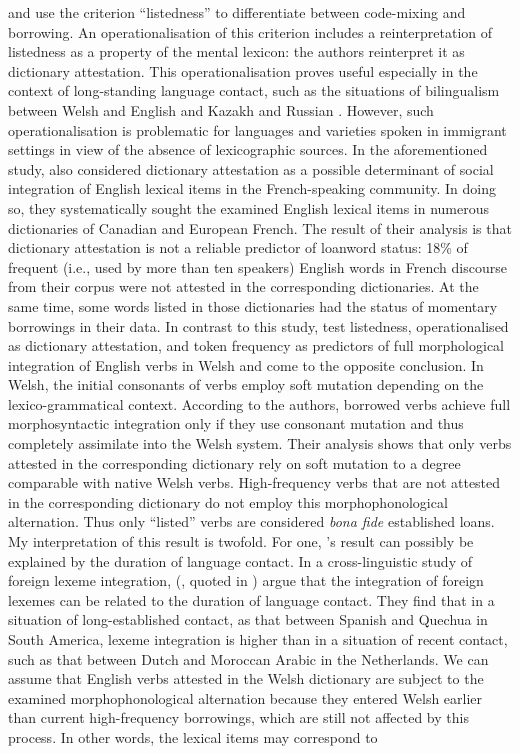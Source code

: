 \citet{muhamedowa-untersuchung-2006} and \citet{stammers-deuchar-2012} use the criterion ``listedness'' to differentiate between code-mixing and borrowing. An operationalisation of this criterion includes a reinterpretation of listedness as a property of the mental lexicon: the authors reinterpret it as dictionary attestation. This operationalisation proves useful especially in the context of long-standing language contact, such as the situations of bilingualism between Welsh and English \citep{stammers-deuchar-2012} and Kazakh and Russian \citep{muhamedowa-untersuchung-2006}. However, such operationalisation is problematic for languages and varieties spoken in immigrant settings in view of the absence of lexicographic sources. In the aforementioned study, \citet{poplack-etal-1988} also considered dictionary attestation as a possible determinant of social integration of English lexical items in the French-speaking community. In doing so, they systematically sought the examined English lexical items in numerous dictionaries of Canadian and European French. The result of their analysis \citep[58--59]{poplack-etal-1988} is that dictionary attestation is not a reliable predictor of loanword status: 18\% of frequent (i.e., used by more than ten speakers) English words in French discourse from their corpus were not attested in the corresponding dictionaries. At the same time, some words listed in those dictionaries had the status of momentary borrowings in their data. In contrast to this study, \citet{stammers-deuchar-2012} test listedness, operationalised as dictionary attestation, and token frequency as predictors of full morphological integration of English verbs in Welsh and come to the opposite conclusion. In Welsh, the initial consonants of verbs employ soft mutation depending on the lexico-grammatical context. According to the authors, borrowed verbs achieve full morphosyntactic integration only if they use consonant mutation and thus completely assimilate into the Welsh system. Their analysis shows that only verbs attested in the corresponding dictionary rely on soft mutation to a degree comparable with native Welsh verbs. High-frequency verbs that are not attested in the corresponding dictionary do not employ this morphophonological alternation. Thus only ``listed'' verbs are considered \textit{bona fide} established loans. My interpretation of this result is twofold. For one, \citeauthor{stammers-deuchar-2012}'s result can possibly be explained by the duration of language contact. In a cross-linguistic study of foreign lexeme integration, \citeauthor{nortier-schatz} (\citeyear{nortier-schatz}, quoted in \citealt[][53]{boumans-syntax-1998}) argue that the integration of foreign lexemes can be related to the duration of language contact. They find that in a situation of long-established contact, as that between Spanish and Quechua in South America, lexeme integration is higher than in a situation of recent contact, such as that between Dutch and Moroccan Arabic in the Netherlands. We can assume that English verbs attested in the Welsh dictionary are subject to the examined morphophonological alternation because they entered Welsh earlier than current high-frequency borrowings, which are still not affected by this process. In other words, the lexical items may correspond to 
